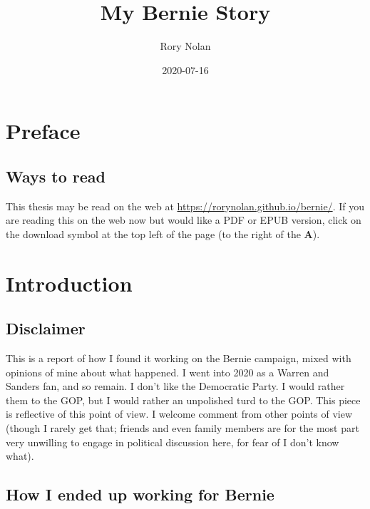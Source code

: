 \documentclass[]{book}
\title{My Bernie Story}
\author{Rory Nolan}
\date{2020-07-16}
\begin{document}
\maketitle

{
\setcounter{tocdepth}{1}
\tableofcontents
}
\hypertarget{preface}{%
\chapter*{Preface}\label{preface}}

\hypertarget{ways-to-read}{%
\section*{Ways to read}\label{ways-to-read}}

This thesis may be read on the web at \url{https://rorynolan.github.io/bernie/}. If you are reading this on the web now but would like a PDF or EPUB version, click on the download symbol at the top left of the page (to the right of the \textbf{A}).

\hypertarget{intro}{%
\chapter{Introduction}\label{intro}}

\hypertarget{disclaimer}{%
\section{Disclaimer}\label{disclaimer}}

This is a report of how I found it working on the Bernie campaign, mixed with opinions of mine about what happened. I went into 2020 as a Warren and Sanders fan, and so remain. I don't like the Democratic Party. I would rather them to the GOP, but I would rather an unpolished turd to the GOP. This piece is reflective of this point of view. I welcome comment from other points of view (though I rarely get that; friends and even family members are for the most part very unwilling to engage in political discussion here, for fear of I don't know what).

\hypertarget{how-i-ended-up-working-for-bernie}{%
\section{How I ended up working for Bernie}\label{how-i-ended-up-working-for-bernie}}
\end{document}
